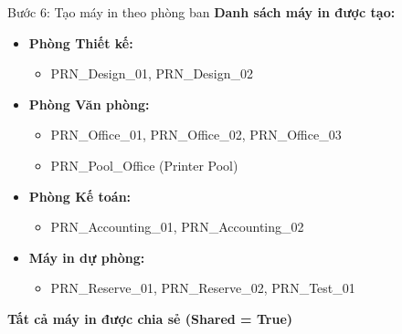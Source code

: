 \documentclass{beamer}
\begin{document}
    \begin{frame}{Bước 6: Tạo máy in theo phòng ban}
        \textbf{Danh sách máy in được tạo:}
        \begin{itemize}
            \item \textbf{Phòng Thiết kế:}
                \begin{itemize}
                    \item PRN\_Design\_01, PRN\_Design\_02
                \end{itemize}
            \item \textbf{Phòng Văn phòng:}
                \begin{itemize}
                    \item PRN\_Office\_01, PRN\_Office\_02, PRN\_Office\_03
                    \item PRN\_Pool\_Office (Printer Pool)
                \end{itemize}
            \item \textbf{Phòng Kế toán:}
                \begin{itemize}
                    \item PRN\_Accounting\_01, PRN\_Accounting\_02
                \end{itemize}
            \item \textbf{Máy in dự phòng:}
                \begin{itemize}
                    \item PRN\_Reserve\_01, PRN\_Reserve\_02, PRN\_Test\_01
                \end{itemize}
        \end{itemize}
        
        \vspace{0.2cm}
        \textbf{Tất cả máy in được chia sẻ (Shared = True)}
    \end{frame}
    
\end{document}
